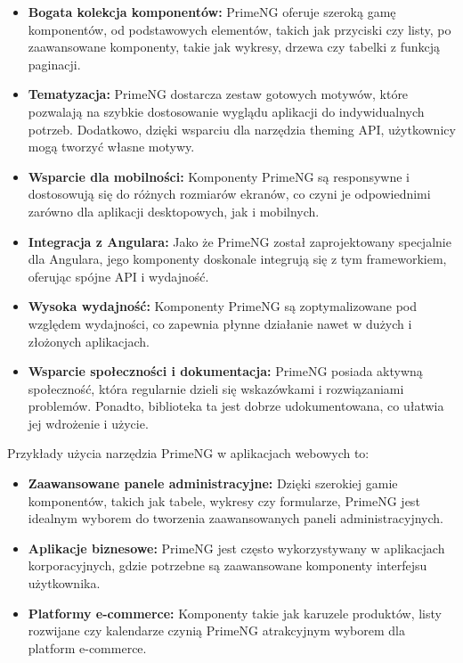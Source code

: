 \begin{itemize}
\item \textbf{Bogata kolekcja komponentów:} PrimeNG oferuje szeroką gamę komponentów, od podstawowych elementów, takich jak przyciski czy listy, po zaawansowane komponenty, takie jak wykresy, drzewa czy tabelki z funkcją paginacji.


\item \textbf{Tematyzacja:} PrimeNG dostarcza zestaw gotowych motywów, które pozwalają na szybkie dostosowanie wyglądu aplikacji do indywidualnych potrzeb. Dodatkowo, dzięki wsparciu dla narzędzia theming API, użytkownicy mogą tworzyć własne motywy.

\item \textbf{Wsparcie dla mobilności:} Komponenty PrimeNG są responsywne i dostosowują się do różnych rozmiarów ekranów, co czyni je odpowiednimi zarówno dla aplikacji desktopowych, jak i mobilnych.

\item \textbf{Integracja z Angulara:} Jako że PrimeNG został zaprojektowany specjalnie dla Angulara, jego komponenty doskonale integrują się z tym frameworkiem, oferując spójne API i wydajność.

\item \textbf{Wysoka wydajność:} Komponenty PrimeNG są zoptymalizowane pod względem wydajności, co zapewnia płynne działanie nawet w dużych i złożonych aplikacjach.

\item \textbf{Wsparcie społeczności i dokumentacja:} PrimeNG posiada aktywną społeczność, która regularnie dzieli się wskazówkami i rozwiązaniami problemów. Ponadto, biblioteka ta jest dobrze udokumentowana, co ułatwia jej wdrożenie i użycie.
\end{itemize}

Przykłady użycia narzędzia PrimeNG w aplikacjach webowych to:

\begin{itemize}
\item \textbf{Zaawansowane panele administracyjne:} Dzięki szerokiej gamie komponentów, takich jak tabele, wykresy czy formularze, PrimeNG jest idealnym wyborem do tworzenia zaawansowanych paneli administracyjnych.

\item \textbf{Aplikacje biznesowe:} PrimeNG jest często wykorzystywany w aplikacjach korporacyjnych, gdzie potrzebne są zaawansowane komponenty interfejsu użytkownika.

\item \textbf{Platformy e-commerce:} Komponenty takie jak karuzele produktów, listy rozwijane czy kalendarze czynią PrimeNG atrakcyjnym wyborem dla platform e-commerce.
\end{itemize}

